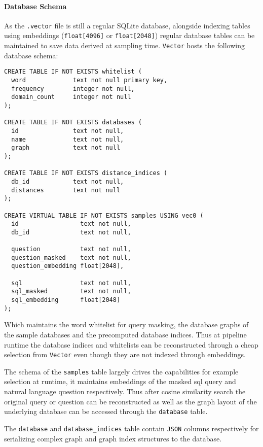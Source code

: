 \paragraph{Database Schema}

As the \texttt{.vector} file is still a regular SQLite database, alongside
indexing tables using embeddings (\texttt{float[4096]} or \texttt{float[2048]})
regular database tables can be maintained to save data derived at sampling
time. \texttt{Vector} hosts the following database schema:

\begin{verbatim}
CREATE TABLE IF NOT EXISTS whitelist (
  word             text not null primary key,
  frequency        integer not null,
  domain_count     integer not null
);

CREATE TABLE IF NOT EXISTS databases (
  id               text not null,
  name             text not null,
  graph            text not null
);

CREATE TABLE IF NOT EXISTS distance_indices (
  db_id            text not null,
  distances        text not null
);

CREATE VIRTUAL TABLE IF NOT EXISTS samples USING vec0 (
  id                 text not null,
  db_id              text not null,

  question           text not null,
  question_masked    text not null,
  question_embedding float[2048],

  sql                text not null,
  sql_masked         text not null,
  sql_embedding      float[2048]
);
\end{verbatim}

Which maintains the word whitelist for query masking, the database graphs of
the sample databases and the precomputed database indices. Thus at pipeline
runtime the database indices and whitelists can be reconstructed through a
cheap selection from \texttt{Vector} even though they are not indexed through
embeddings.

The schema of the \texttt{samples} table largely drives the capabilities for
example selection at runtime, it maintains embeddings of the masked sql query
and natural language question respectively. Thus after cosine similarity search
the original query or question can be reconstructed as well as the graph layout
of the underlying database can be accessed through the \texttt{database} table.

The \texttt{database} and \texttt{database\_indices} table contain \texttt{JSON}
columns respectively for serializing complex graph and graph index structures
to the database.

